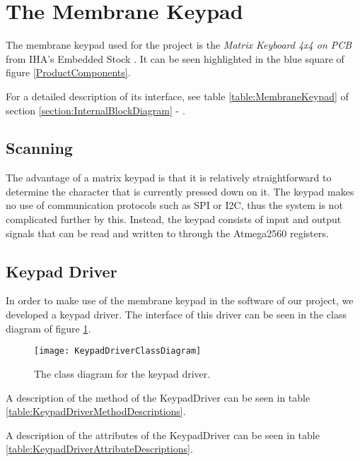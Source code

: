 \section{The Membrane Keypad}
\label{section:MatrixKeyboard}

The membrane keypad used for the project is the \textit{Matrix Keyboard 4x4 on PCB} from IHA's Embedded Stock \cite{MatrixKeyboard}. It can be seen highlighted in the blue square of figure \ref{ProductComponents}.

For a detailed description of its interface, see table \ref{table:MembraneKeypad} of section \ref{section:InternalBlockDiagram} - .

\subsection{Scanning}
The advantage of a matrix keypad is that it is relatively straightforward to determine the character that is currently pressed down on it. The keypad makes no use of communication protocols such as SPI or I2C, thus the system is not complicated further by this. Instead, the keypad consists of input and output signals that can be read and written to through the Atmega2560 registers.

\subsection{Keypad Driver}
In order to make use of the membrane keypad in the software of our project, we developed a keypad driver. The interface of this driver can be seen in the class diagram of figure \ref{KeypadDriverClassDiagram}.

\begin{figure}[H]
	\texttt{[image: KeypadDriverClassDiagram]}
	\centering
	\caption{The class diagram for the keypad driver.}
	\label{KeypadDriverClassDiagram}
\end{figure}

A description of the method of the KeypadDriver can be seen in table \ref{table:KeypadDriverMethodDescriptions}.

A description of the attributes of the KeypadDriver can be seen in table \ref{table:KeypadDriverAttributeDescriptions}.


